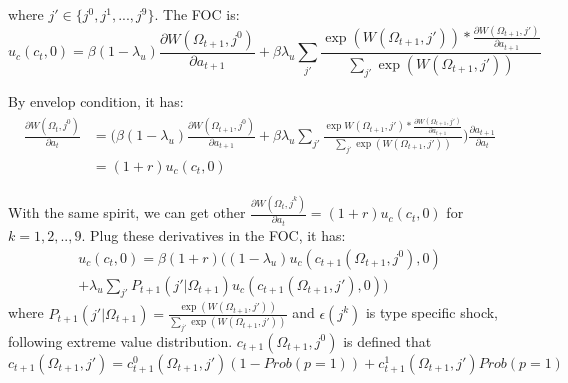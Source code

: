 \documentclass{article}
\begin{document}
\begin{enumerate}[{}1{).}]
\begin{enumerate}[{}a{).}]
					where $j' \in \{j^0, j^1, ..., j^9\}$. The FOC is:
						\[ u_c(c_t, 0) =  \beta(1-\lambda_u)\frac{\partial W(\Omega_{t+1}, j^0)}{\partial a_{t+1}} + \beta\lambda_u \sum_{j'}\frac{\exp(W(\Omega_{t+1}, j'))*\frac{\partial W(\Omega_{t+1}, j')}{\partial a_{t+1}}}{\sum_{j'}\exp(W(\Omega_{t+1}, j'))} \tag{1} \]
					
					By envelop condition, it has:
						\begin{align*}
							\begin{split}
								\frac{\partial W(\Omega_{t}, j^0)}{\partial a_{t}} &=\bigg( \beta(1-\lambda_u)\frac{\partial W(\Omega_{t+1}, j^0)}{\partial a_{t+1}} + \beta\lambda_u\sum_{j'}\frac{\exp W(\Omega_{t+1}, j')*\frac{\partial W(\Omega_{t+1}, j')}{\partial a_{t+1}}}{\sum_{j'}\exp(W(\Omega_{t+1}, j'))}\bigg) \frac{\partial a_{t+1}}{\partial a_{t}} \\
								& = (1+r)u_c(c_{t}, 0)
							\end{split}
						\end{align*}
						
					With the same spirit, we can get other $\frac{\partial W(\Omega_{t}, j^k)}{\partial a_{t}} = (1+r)u_c(c_t, 0)$ for $k =1, 2, .., 9$. Plug these derivatives in the FOC, it has:
						\begin{multline*}
							u_c(c_t, 0) = \beta(1+r)\Big((1-\lambda_u)u_c(c_{t+1}(\Omega_{t+1}, j^0), 0) \\
							+ \lambda_u \sum_{j'} P_{t+1}(j'|\Omega_{t+1}) u_c(c_{t+1}(\Omega_{t+1}, j'), 0)\Big) \tag{2}
						\end{multline*}
					where $P_{t+1}(j'|\Omega_{t+1}) = \frac{\exp(W(\Omega_{t+1}, j'))}{\sum_{j'}\exp(W(\Omega_{t+1}, j'))}$ and $\epsilon(j^k)$ is type specific shock, following extreme value distribution. $c_{t+1}(\Omega_{t+1}, j^0)$ is defined that
						$$ c_{t+1}(\Omega_{t+1}, j') = c^0_{t+1}(\Omega_{t+1}, j')(1 - Prob(p=1)) +  c^1_{t+1}(\Omega_{t+1}, j')Prob(p=1) $$ 
					

\end{enumerate}
\end{enumerate}
\end{document}
